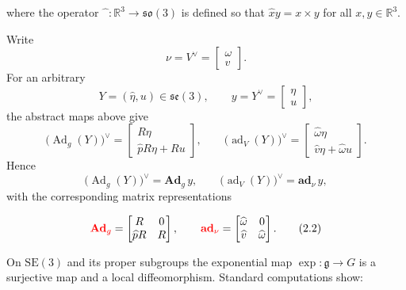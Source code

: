 \documentclass[11pt]{article}
\newcommand{\rev}[1]{\textcolor{red}{#1}}
\newenvironment{revision}{\color{red}}{}
\newcommand{\bAd}{\mathbf{Ad}}
\newcommand{\bad}{\mathbf{ad}}
\newcommand{\SE}{\mathrm{SE}}
\newcommand{\so}{\mathfrak{so}}
\newcommand{\se}{\mathfrak{se}}
\newcommand{\gfrak}{\mathfrak g}
\newcommand{\Ad}{\operatorname{Ad}}
\newcommand{\ad}{\operatorname{ad}}
\newcommand{\R}{\mathbb R}
\begin{document}
where the operator $\widehat{\phantom{x}}:\R^3\to\so(3)$ is defined so that $\widehat x y=x\times y$ for all $x,y\in\R^3$.

\begin{revision}
Write
\[
\nu=V^\vee=\begin{bmatrix}\omega\\v\end{bmatrix}.
\]
For an arbitrary
\[
Y=(\widehat\eta,u)\in\se(3),\qquad
y=Y^\vee=\begin{bmatrix}\eta\\u\end{bmatrix},
\]
the abstract maps above give
\[
\bigl(\Ad_g(Y)\bigr)^\vee
=
\begin{bmatrix}
R\eta\\
\widehat pR\eta+Ru
\end{bmatrix},
\qquad
\bigl(\ad_V(Y)\bigr)^\vee
=
\begin{bmatrix}
\widehat\omega\eta\\
\widehat v\eta+\widehat\omega u
\end{bmatrix}.
\]
Hence
\[
\bigl(\Ad_g(Y)\bigr)^\vee=\bAd_g\,y,
\qquad
\bigl(\ad_V(Y)\bigr)^\vee=\bad_\nu\,y,
\]
with the corresponding matrix representations
\end{revision}

\begin{equation*}
\rev{\bAd_g}=\begin{bmatrix}R&0\\\widehat pR&R\end{bmatrix},\qquad
\rev{\bad_\nu}=\begin{bmatrix}\widehat\omega&0\\\widehat v&\widehat\omega\end{bmatrix}.\tag{2.2}\label{eq:2.2}
\end{equation*}

On $\SE(3)$ and its proper subgroups the exponential map $\exp:\gfrak\to G$ is a surjective map and a local diffeomorphism. Standard computations show:
\end{document}
